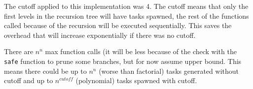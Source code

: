 \documentclass[12pt]{article}
\begin{document}
The cutoff applied to this implementation was 4. The cutoff means that only the first levels in the recursion tree will have tasks spawned, the rest of the functions called because of the recursion will be executed sequentially. This saves the overhead that will increase exponentially if there was no cutoff.

There are \( n^n \) max function calls (it will be less because of the check with the {\tt safe} function to prune some branches, but for now assume upper bound. This means there could be up to \( n^n \) (worse than factorial) tasks generated without cutoff and up to \( n^{cutoff} \) (polynomial) tasks spawned with cutoff.
\end{document}
